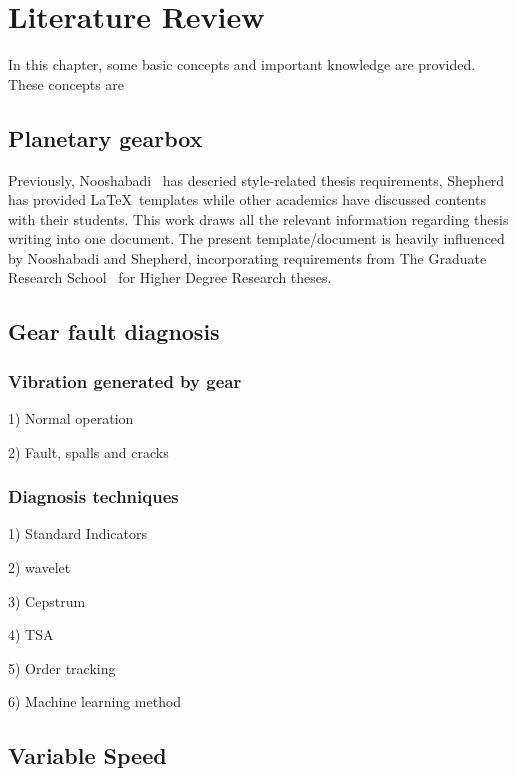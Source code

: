 \chapter{Literature Review}\label{ch:literature}

In this chapter, some basic concepts and important knowledge are provided. These concepts are 

\section{Planetary gearbox}

Previously, Nooshabadi~\cite{pa} has descried style-related thesis
requirements, Shepherd~\cite{She05} has provided \LaTeX\ templates while
other academics have discussed contents with their students.  This work
draws all the relevant information regarding thesis writing into one
document.  The present template/document is heavily influenced by
Nooshabadi and Shepherd, incorporating requirements from The Graduate
Research School~\cite{GRS14} for Higher Degree Research theses.


\section{Gear fault diagnosis}

\subsection{Vibration generated by gear}

1)	Normal operation

2)	Fault, spalls and cracks

\subsection{Diagnosis techniques}

1)	Standard Indicators

2)	wavelet

3)	Cepstrum

4)	TSA

5)	Order tracking

6)	Machine learning method


\section{Variable Speed}